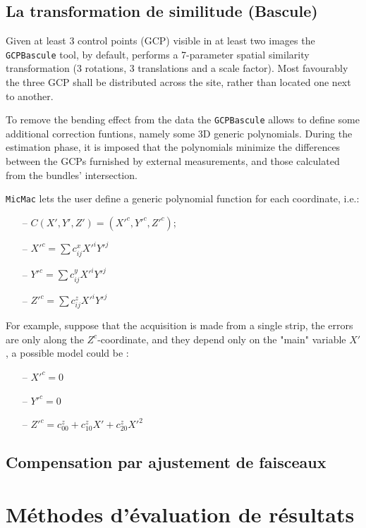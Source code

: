 \documentclass[11pt,a4paper,oneside]{book}
\begin{document}
\subsection{La transformation de similitude (Bascule)}\label{subsec:basc}
%
Given at least 3 control points (GCP) visible in at least two images the {\tt GCPBascule} tool, by default, performs a 7-parameter spatial similarity transformation (3 rotations, 3 translations and a scale factor). Most favourably the three GCP shall be distributed across the site, rather than located one next to another.\par 
%
To remove the bending effect from the data the {\tt GCPBascule} allows to define some additional correction funtions, namely some 3D generic polynomials. During the estimation phase, it is imposed that the polynomials minimize the differences between the GCPs furnished by external measurements, and those calculated from the bundles' intersection. \par 
%
{\tt MicMac} lets the user define a generic polynomial function for each coordinate, i.e.:
%
\begin{itemize}
   \item[--] $C(X',Y',Z') = (X'^c,Y'^c,Z'^c)$;
   \item[--] $X'^c = \sum c^x_{ij} X'^i Y'^j$
   \item[--] $Y'^c = \sum c^y_{ij} X'^i Y'^j$
   \item[--] $Z'^c = \sum c^z_{ij} X'^i Y'^j$
\end{itemize}
%
For example, suppose that the acquisition is made from a single strip, the errors are only along the $Z^c$-coordinate,  and they depend only on  the "main" variable $X'$, a possible model could be :
%
\begin{itemize}
   \item[--] $X'^c = 0$
   \item[--] $Y'^c = 0$
   \item[--] $Z'^c =  c^z_{00} + c^z_{10} X' + c^z_{20} X'^2$
\end{itemize}
%
\subsection{Compensation par ajustement de faisceaux}\label{subsec:compensation}

\section{Méthodes d’évaluation de résultats}
\end{document}
